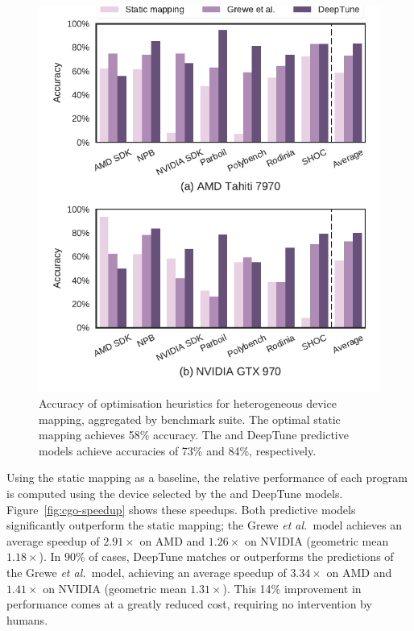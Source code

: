 \begin{figure}
	\centering %
	\includegraphics[width=.85\columnwidth]{img/cgo-acc}%
	\caption[Accuracy of optimisation heuristics for heterogeneous device mapping]{%
		Accuracy of optimisation heuristics for heterogeneous device mapping, aggregated by benchmark suite. The optimal static mapping achieves 58\% accuracy. The \citeauthor{Grewe2013} and DeepTune predictive models achieve accuracies of 73\% and 84\%, respectively.%
	}
	\label{fig:cgo-accuracy}
\end{figure}

Using the static mapping as a baseline, the relative performance of each program is computed using the device selected by the \citeauthor{Grewe2013} and DeepTune models. Figure~\ref{fig:cgo-speedup} shows these speedups. Both predictive models significantly outperform the static mapping; the Grewe \emph{et al.\ }model achieves an average speedup of $2.91\times$ on AMD and $1.26\times$ on NVIDIA (geometric mean $1.18\times$). In 90\% of cases, DeepTune matches or outperforms the predictions of the Grewe \emph{et al.\ }model, achieving an average speedup of $3.34\times$ on AMD and $1.41\times$ on NVIDIA (geometric mean $1.31\times$). This 14\% improvement in performance comes at a greatly reduced cost, requiring no intervention by humans.

